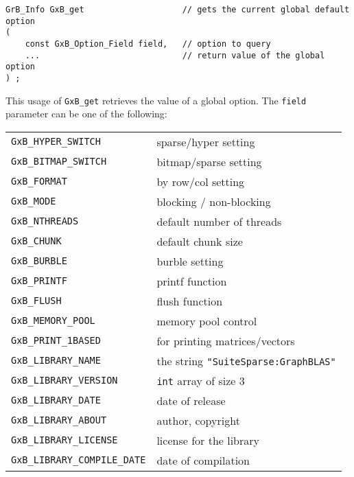 \documentclass[12pt]{article}
\begin{document}
\begin{mdframed}[userdefinedwidth=6in]
{\footnotesize
\begin{verbatim}
GrB_Info GxB_get                    // gets the current global default option
(
    const GxB_Option_Field field,   // option to query
    ...                             // return value of the global option
) ;
\end{verbatim} } \end{mdframed}

This usage of \verb'GxB_get' retrieves the value of a global option.  The
\verb'field' parameter can be one of the following:

\vspace{0.2in}
{\footnotesize
\begin{tabular}{ll}
        \hline
        \verb'GxB_HYPER_SWITCH'         & sparse/hyper setting \\
        \verb'GxB_BITMAP_SWITCH'        & bitmap/sparse setting \\
        \verb'GxB_FORMAT'               & by row/col setting \\
        \verb'GxB_MODE'                 & blocking / non-blocking \\
        \verb'GxB_NTHREADS'             & default number of threads \\
        \verb'GxB_CHUNK'                & default chunk size \\
        \verb'GxB_BURBLE'       & burble setting \\
        \verb'GxB_PRINTF'       & printf function \\
        \verb'GxB_FLUSH'        & flush function \\
        \verb'GxB_MEMORY_POOL'  & memory pool control \\
        \verb'GxB_PRINT_1BASED' & for printing matrices/vectors \\
        \hline
        \verb'GxB_LIBRARY_NAME'         & the string
                                        \verb'"SuiteSparse:GraphBLAS"' \\
        \verb'GxB_LIBRARY_VERSION'      & \verb'int' array of size 3 \\
        \verb'GxB_LIBRARY_DATE'         & date of release \\
        \verb'GxB_LIBRARY_ABOUT'        & author, copyright \\
        \verb'GxB_LIBRARY_LICENSE'      & license for the library \\
        \verb'GxB_LIBRARY_COMPILE_DATE' & date of compilation \\

\end{tabular}}
\end{document}
